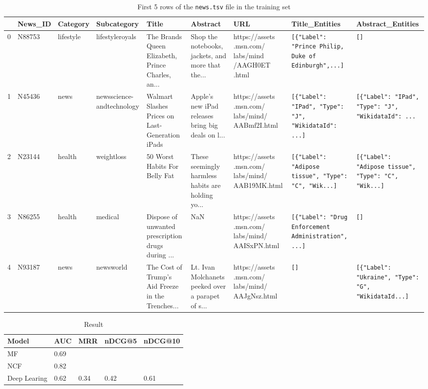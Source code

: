 \documentclass[9pt,twocolumn,twoside,lineno]{gsajnl}
\begin{document}
\begin{table}[p]
\centering
\caption{First 5 rows of the \texttt{news.tsv} ﬁle in the training set}
\begin{tableminipage}{\textwidth}
\begin{tabularx}{\textwidth}{@{}cXXXXXXXX@{}}
\hline
{} & {\bf News\_ID} & {\bf Category} & {\bf Subcategory} & {\bf Title} & {\bf Abstract} & {\bf URL} & {\bf Title\_Entities} & {\bf Abstract\_Entities}\\
\hline
0 & N88753 & lifestyle & lifestyleroyals & The Brands Queen Elizabeth, Prince Charles, an... & Shop the notebooks, jackets, and more that the... & https://assets .msn.com/ labs/mind /AAGH0ET .html & \texttt{[\{"Label": "Prince Philip, Duke of Edinburgh",...]} & \texttt{[]}\\
1 & N45436 & news & newsscience-andtechnology & Walmart Slashes Prices on Last-Generation iPads & Apple's new iPad releases bring big deals on l... & https://assets .msn.com/ labs/mind/ AABmf2I.html & \texttt{[\{"Label": "IPad", "Type": "J", "WikidataId": ...]} & \texttt{[\{"Label": "IPad", "Type": "J", "WikidataId": ...}\\
2 & N23144 & health & weightloss & 50 Worst Habits For Belly Fat & These seemingly harmless habits are holding yo... & https://assets .msn.com/ labs/mind/ AAB19MK.html & \texttt{[\{"Label": "Adipose tissue", "Type": "C", "Wik...]} & \texttt{[\{"Label": "Adipose tissue", "Type": "C", "Wik...]}\\
3 & N86255 & health & medical & Dispose of unwanted prescription drugs during ... & NaN & https://assets .msn.com/ labs/mind/ AAISxPN.html & \texttt{[\{"Label": "Drug Enforcement Administration", ...]} & \texttt{[]}\\
4 & N93187 & news & newsworld & The Cost of Trump's Aid Freeze in the Trenches... & Lt. Ivan Molchanets peeked over a parapet of s... & https://assets .msn.com/ labs/mind/ AAJgNsz.html & \texttt{[]} & \texttt{[\{"Label": "Ukraine", "Type": "G", "WikidataId...]}\\
\hline
\end{tabularx}
  \label{tab:3}
\end{tableminipage}
\end{table}

\begin{table}[p]
\centering
\caption{Result}
\begin{tableminipage}{\textwidth}
\begin{tabularx}{\textwidth}{@{}XXXXX@{}}
\hline
{\bf Model} & {\bf AUC} & {\bf MRR} & {\bf nDCG@5} & {\bf nDCG@10} \\
\hline
MF & 0.69  &	 &  &\\
NCF & 0.82  &	&  & \\
Deep Learing &	0.62  &	0.34 & 0.42 & 0.61\\
\hline
\end{tabularx}
  \label{tab:4}
\end{tableminipage}
\end{table}

\nocite{*}

\end{document}
